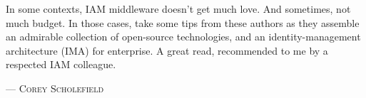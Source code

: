 In some contexts, IAM middleware doesn't get much love. And sometimes, not much budget. In those cases, take some tips from these authors as they assemble an admirable collection of open-source technologies, and an identity-management architecture (IMA) for enterprise. A great read, recommended to me by a respected IAM colleague.
\setlength{\parindent}{0cm}\par\textsc{ --- Corey Scholefield }\par\vspace{12pt}\setlength{\parindent}{15pt}
